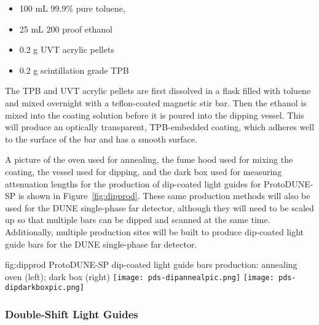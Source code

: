 \begin{itemize}
\item 100 mL 99.9\% pure toluene,
\item 25 mL 200 proof ethanol
\item 0.2 g UVT acrylic pellets
\item 0.2 g scintillation grade TPB
\end{itemize}

The TPB and UVT acrylic pellets are first dissolved in a flask filled with toluene and mixed overnight with a teflon-coated magnetic stir bar.  Then the ethanol is mixed into the coating solution before it is poured into the dipping vessel.  This will produce an optically transparent, TPB-embedded coating, which adheres well to the surface of the bar and has a smooth surface.

A picture of the oven used for annealing, the fume hood used for mixing the coating, the vessel used for dipping, and the dark box used for measuring attenuation lengths for the production of dip-coated light guides for ProtoDUNE-SP is shown in Figure~\ref{fig:dipprod}.  These same production methods will also be used for the DUNE single-phase far detector, although they will need to be scaled up so that multiple bars can be dipped and scanned at the same time.  Additionally, multiple production sites will be built to produce dip-coated light guide bars for the DUNE single-phase far detector.

\begin{dunefigure}{fig:dipprod}
{ProtoDUNE-SP dip-coated light guide bars production: annealing oven (left); dark box (right)}
  \texttt{[image: pds-dipannealpic.png]}
  \texttt{[image: pds-dipdarkboxpic.png]}
\end{dunefigure}




\subsubsection{Double-Shift Light Guides}
\label{ssec:fdsp-pd-pc-prod-bar2}

